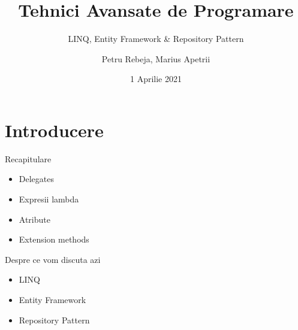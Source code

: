 \documentclass[presentation]{beamer}
\author{Petru Rebeja, Marius Apetrii}
\date{1 Aprilie 2021}
\title{Tehnici Avansate de Programare}
\subtitle{LINQ, Entity Framework \& Repository Pattern}
\institute[UAIC]{Facultatea de Matematică\\Universitatea Alexandru Ioan Cuza, Iași}
\begin{document}
\maketitle
\section{Introducere}
\label{sec:org2daf0f7}
\begin{frame}[label={sec:org4f93e43}]{Recapitulare}
\begin{itemize}
\item Delegates
\item Expresii lambda
\item Atribute
\item Extension methods
\end{itemize}
\end{frame}
\begin{frame}[label={sec:org4261c2b}]{Despre ce vom discuta azi}
\begin{itemize}
\item LINQ
\item Entity Framework
\item Repository Pattern
\end{itemize}
\end{frame}
\end{document}
